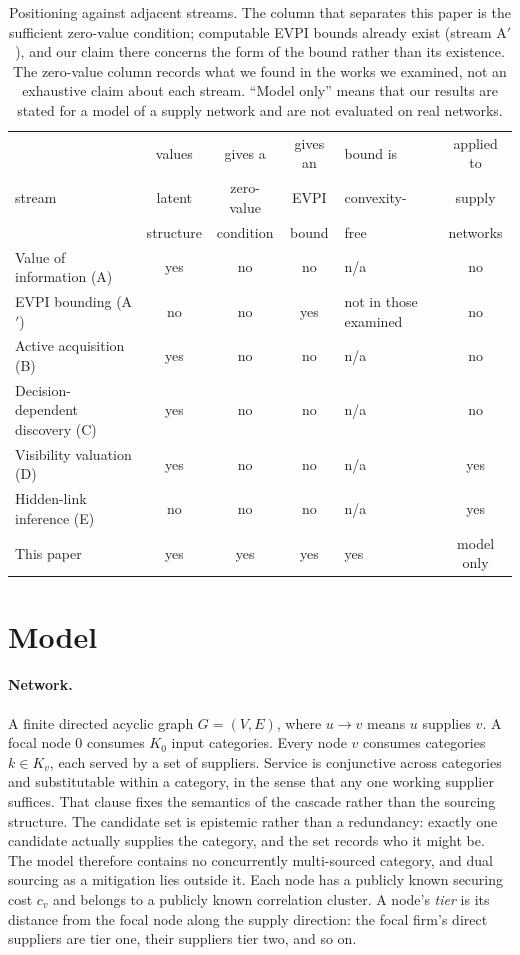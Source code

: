 \documentclass[pdflatex,sn-mathphys-num]{sn-jnl}
\theoremstyle{thmstyleone}
\theoremstyle{thmstyletwo}
\theoremstyle{thmstylethree}
\begin{document}
\begin{table}[ht]
\caption{Positioning against adjacent streams. The column that separates
this paper is the sufficient zero-value condition; computable EVPI bounds
already exist (stream A$'$), and our claim there concerns the form of the
bound rather than its existence. The zero-value column records what we found
in the works we examined, not an exhaustive claim about each
stream. ``Model only'' means that our results are stated for a model of a
supply network and are not evaluated on real networks.}\label{tab:novelty}
\small
\begin{tabular}{@{}p{3.7cm}cccp{1.8cm}c@{}}
\toprule
& values & gives a & gives an & bound is & applied to \\
stream & latent & zero-value & EVPI & convexity- & supply \\
& structure & condition & bound & free & networks \\
\midrule
Value of information (A) & yes & no & no & n/a & no \\
EVPI bounding (A$'$) & no & no & yes & not in those examined & no \\
Active acquisition (B) & yes & no & no & n/a & no \\
Decision-dependent discovery (C) & yes & no & no & n/a & no \\
Visibility valuation (D) & yes & no & no & n/a & yes \\
Hidden-link inference (E) & no & no & no & n/a & yes \\
This paper & yes & yes & yes & yes & model only \\
\bottomrule
\end{tabular}
\end{table}

\section{Model}\label{sec:model}

\paragraph{Network.} A finite directed acyclic graph $G=(V,E)$, where
$u\to v$ means $u$ supplies $v$. A focal node $0$ consumes $K_0$ input
categories. Every node $v$ consumes categories $k\in K_v$, each served by a
set of suppliers. Service is conjunctive across categories and substitutable
within a category, in the sense that any one working supplier suffices. That
clause fixes the semantics of the cascade rather than the sourcing structure.
The candidate set is epistemic rather than a redundancy: exactly one candidate
actually supplies the category, and the set records who it might be. The
model therefore contains no concurrently multi-sourced category, and dual
sourcing as a mitigation lies outside it. Each node has a publicly known securing cost $c_v$ and
belongs to a publicly known correlation cluster. A node's \emph{tier} is its
distance from the focal node along the supply direction: the focal firm's
direct suppliers are tier one, their suppliers tier two, and so on.
\end{document}
